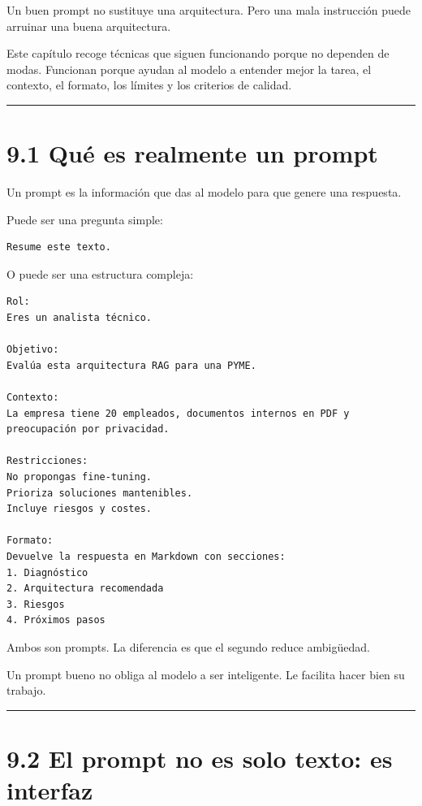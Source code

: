 Un buen prompt no sustituye una arquitectura. Pero una mala instrucción
puede arruinar una buena arquitectura.

Este capítulo recoge técnicas que siguen funcionando porque no dependen
de modas. Funcionan porque ayudan al modelo a entender mejor la tarea,
el contexto, el formato, los límites y los criterios de calidad.

\begin{center}\rule{0.5\linewidth}{0.5pt}\end{center}

\section{9.1 Qué es realmente un
prompt}\label{quuxe9-es-realmente-un-prompt}

Un prompt es la información que das al modelo para que genere una
respuesta.

Puede ser una pregunta simple:

\begin{lstlisting}
Resume este texto.
\end{lstlisting}

O puede ser una estructura compleja:

\begin{lstlisting}
Rol:
Eres un analista técnico.

Objetivo:
Evalúa esta arquitectura RAG para una PYME.

Contexto:
La empresa tiene 20 empleados, documentos internos en PDF y preocupación por privacidad.

Restricciones:
No propongas fine-tuning.
Prioriza soluciones mantenibles.
Incluye riesgos y costes.

Formato:
Devuelve la respuesta en Markdown con secciones:
1. Diagnóstico
2. Arquitectura recomendada
3. Riesgos
4. Próximos pasos
\end{lstlisting}

Ambos son prompts. La diferencia es que el segundo reduce ambigüedad.

Un prompt bueno no obliga al modelo a ser inteligente. Le facilita hacer
bien su trabajo.

\begin{center}\rule{0.5\linewidth}{0.5pt}\end{center}

\section{9.2 El prompt no es solo texto: es
interfaz}\label{el-prompt-no-es-solo-texto-es-interfaz}

